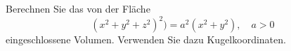 \begin{atiTask}[
  title = Volumenberechnung,
  call = Zusatzaufgabe,
]
 Berechnen Sie das von der Fläche
 \begin{equation*}
(x^2+y^2+z^2)^2)=a^2(x^2+y^2), \quad a>0
 \end{equation*}
eingeschlossene Volumen. Verwenden Sie dazu Kugelkoordinaten.

\end{atiTask}